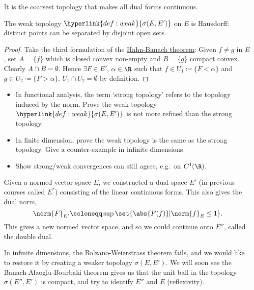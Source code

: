 \documentclass[twoside]{article}
\begin{document}
It is the coarsest topology that makes all dual forms continuous.
\begin{prop}
    The weak topology $\hyperlink{def:weak}{\sigma(E, E')}$ on $E$ is Hausdorff: distinct points can be separated by disjoint open sets.
\end{prop}
\begin{proof}
    Take the third formulation of the \hyperlink{thm:hb}{Hahn-Banach theorem}:
    Given $f \neq g$ in $E$, set $A = \{f\}$ which is closed convex non-empty and $B=\{g\}$ compact convex. Clearly $A \cap B = \emptyset$.
    Hence $\exists F \in E'$, $\alpha \in \R$ such that $f \in U_1 \coloneqq \{F < \alpha\}$ and $g \in U_2 \coloneqq \{F > \alpha\}$, $U_1 \cap U_2 = \emptyset$ by definition.
\end{proof}
\begin{remark}\leavevmode
    \begin{itemize}
        \item In functional analysis, the term `strong topology' refers to the topology induced by the norm.
        Prove the weak topology $\hyperlink{def:weak}{\sigma(E, E')}$ is not more refined than the strong topology.
        \item In finite dimension, prove the weak topology is the same as the strong topology. Give a counter-example in infinite dimensions.
        \item Show strong/weak convergences can still agree, e.g.\ on $C^1(\R)$.
    \end{itemize}
\end{remark}
\begin{remark}
    Given a normed vector space $E$, we constructed a dual space $E'$ (in previous courses called $E^*$) consisting of the linear continuous forms.
    This also gives the dual norm,
    \begin{equation*}
        \norm{F}_{E'} \coloneqq \sup\set{\abs{F(f)} | \norm{f}_E \leq 1}.
    \end{equation*}
    This gives a new normed vector space, and so we could continue onto $E''$, called the double dual.

    In infinite dimensions, the Bolzano-Weierstrass theorem fails, and we would like to restore it by creating a weaker topology $\sigma(E, E')$.
    We will soon see the Banach-Alaoglu-Bourbaki theorem gives us that the unit ball in the topology $\sigma(E'', E')$ is compact, and try to identify $E''$ and $E$ (reflexivity).
\end{remark}
\end{document}
